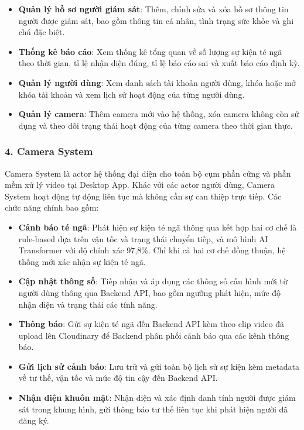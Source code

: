 \begin{itemize}[leftmargin=1.5cm]
  \item \textbf{Quản lý hồ sơ người giám sát}: Thêm, chỉnh sửa
        và xóa hồ sơ thông tin người được giám sát, bao gồm thông
        tin cá nhân, tình trạng sức khỏe và ghi chú đặc biệt.
  \item \textbf{Thống kê báo cáo}: Xem thống kê tổng quan về số
        lượng sự kiện té ngã theo thời gian, tỉ lệ nhận diện
        đúng, tỉ lệ báo cáo sai và xuất báo cáo định kỳ.
  \item \textbf{Quản lý người dùng}: Xem danh sách tài khoản
        người dùng, khóa hoặc mở khóa tài khoản và xem lịch sử
        hoạt động của từng người dùng.
  \item \textbf{Quản lý camera}: Thêm camera mới vào hệ thống,
        xóa camera không còn sử dụng và theo dõi trạng thái hoạt
        động của từng camera theo thời gian thực.
\end{itemize}

\subsubsection{4. Camera System}

Camera System là actor hệ thống đại diện cho toàn bộ cụm phần
cứng và phần mềm xử lý video tại Desktop App. Khác với các actor
người dùng, Camera System hoạt động tự động liên tục mà không
cần sự can thiệp trực tiếp. Các chức năng chính bao gồm:

\begin{itemize}[leftmargin=1.5cm]
  \item \textbf{Cảnh báo té ngã}: Phát hiện sự kiện té ngã thông
        qua kết hợp hai cơ chế là rule-based dựa trên vận tốc và
        trạng thái chuyển tiếp, và mô hình AI Transformer với độ
        chính xác 97,8\%. Chỉ khi cả hai cơ chế đồng thuận, hệ
        thống mới xác nhận sự kiện té ngã.
  \item \textbf{Cập nhật thông số}: Tiếp nhận và áp dụng các
        thông số cấu hình mới từ người dùng thông qua Backend API,
        bao gồm ngưỡng phát hiện, mức độ nhận diện và trạng thái
        các tính năng.
  \item \textbf{Thông báo}: Gửi sự kiện té ngã đến Backend API
        kèm theo clip video đã upload lên Cloudinary để Backend
        phân phối cảnh báo qua các kênh thông báo.
  \item \textbf{Gửi lịch sử cảnh báo}: Lưu trữ và gửi toàn bộ
        lịch sử sự kiện kèm metadata về tư thế, vận tốc và mức
        độ tin cậy đến Backend API.
  \item \textbf{Nhận diện khuôn mặt}: Nhận diện và xác định danh
        tính người được giám sát trong khung hình, gửi thông báo
        tư thế liên tục khi phát hiện người đã đăng ký.

\end{itemize}



